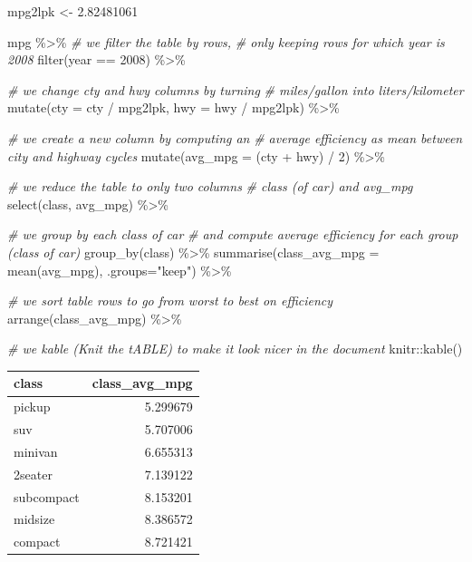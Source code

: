 \documentclass[
]{book}
\newenvironment{Shaded}{\begin{snugshade}}{\end{snugshade}}
\newcommand{\AttributeTok}[1]{\textcolor[rgb]{0.77,0.63,0.00}{#1}}
\newcommand{\CommentTok}[1]{\textcolor[rgb]{0.56,0.35,0.01}{\textit{#1}}}
\newcommand{\DecValTok}[1]{\textcolor[rgb]{0.00,0.00,0.81}{#1}}
\newcommand{\FloatTok}[1]{\textcolor[rgb]{0.00,0.00,0.81}{#1}}
\newcommand{\FunctionTok}[1]{\textcolor[rgb]{0.00,0.00,0.00}{#1}}
\newcommand{\NormalTok}[1]{#1}
\newcommand{\OtherTok}[1]{\textcolor[rgb]{0.56,0.35,0.01}{#1}}
\newcommand{\SpecialCharTok}[1]{\textcolor[rgb]{0.00,0.00,0.00}{#1}}
\newcommand{\StringTok}[1]{\textcolor[rgb]{0.31,0.60,0.02}{#1}}
\begin{document}
\begin{Shaded}
\begin{Highlighting}[]
\NormalTok{mpg2lpk }\OtherTok{\textless{}{-}} \FloatTok{2.82481061}

\NormalTok{mpg }\SpecialCharTok{\%\textgreater{}\%}
  \CommentTok{\# we filter the table by rows, }
  \CommentTok{\# only keeping rows for which year is 2008}
  \FunctionTok{filter}\NormalTok{(year }\SpecialCharTok{==} \DecValTok{2008}\NormalTok{) }\SpecialCharTok{\%\textgreater{}\%}
  
  \CommentTok{\# we change cty and hwy columns by turning}
  \CommentTok{\# miles/gallon into liters/kilometer}
  \FunctionTok{mutate}\NormalTok{(}\AttributeTok{cty =}\NormalTok{ cty }\SpecialCharTok{/}\NormalTok{ mpg2lpk,}
         \AttributeTok{hwy =}\NormalTok{ hwy }\SpecialCharTok{/}\NormalTok{ mpg2lpk) }\SpecialCharTok{\%\textgreater{}\%}
  
  \CommentTok{\# we create a new column by computing an }
  \CommentTok{\# average efficiency as mean between city and highway cycles}
  \FunctionTok{mutate}\NormalTok{(}\AttributeTok{avg\_mpg =}\NormalTok{ (cty }\SpecialCharTok{+}\NormalTok{ hwy) }\SpecialCharTok{/} \DecValTok{2}\NormalTok{) }\SpecialCharTok{\%\textgreater{}\%}
  
  \CommentTok{\# we reduce the table to only two columns}
  \CommentTok{\# class (of car) and avg\_mpg}
  \FunctionTok{select}\NormalTok{(class, avg\_mpg) }\SpecialCharTok{\%\textgreater{}\%}
  
  \CommentTok{\# we group by each class of car}
  \CommentTok{\# and compute average efficiency for each group (class of car)}
  \FunctionTok{group\_by}\NormalTok{(class) }\SpecialCharTok{\%\textgreater{}\%}
  \FunctionTok{summarise}\NormalTok{(}\AttributeTok{class\_avg\_mpg =} \FunctionTok{mean}\NormalTok{(avg\_mpg), }\AttributeTok{.groups=}\StringTok{"keep"}\NormalTok{) }\SpecialCharTok{\%\textgreater{}\%}
  
  \CommentTok{\# we sort table rows to go from worst to best on efficiency}
  \FunctionTok{arrange}\NormalTok{(class\_avg\_mpg) }\SpecialCharTok{\%\textgreater{}\%}
  
  \CommentTok{\# we kable (Knit the tABLE) to make it look nicer in the document}
\NormalTok{  knitr}\SpecialCharTok{::}\FunctionTok{kable}\NormalTok{()}
\end{Highlighting}
\end{Shaded}

\begin{tabular}{l|r}
\hline
class & class\_avg\_mpg\\
\hline
pickup & 5.299679\\
\hline
suv & 5.707006\\
\hline
minivan & 6.655313\\
\hline
2seater & 7.139122\\
\hline
subcompact & 8.153201\\
\hline
midsize & 8.386572\\
\hline
compact & 8.721421\\
\hline
\end{tabular}
\end{document}
